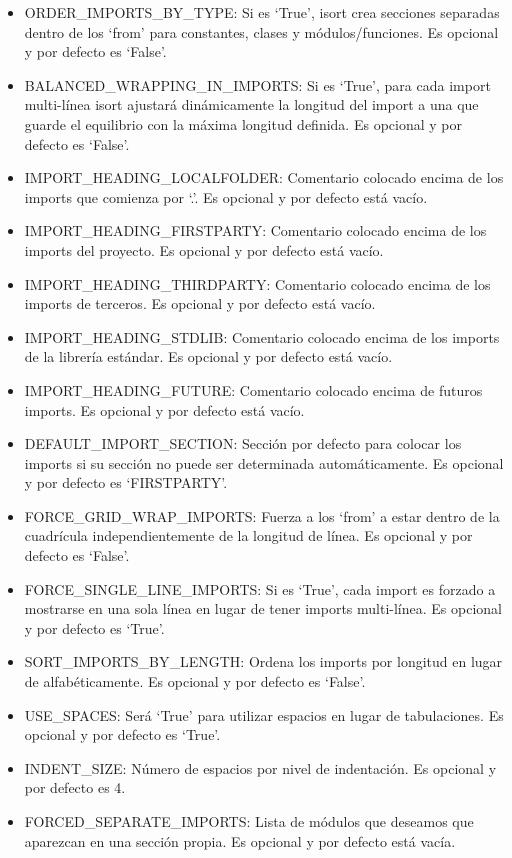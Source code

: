 \documentclass[a4paper, 12pt]{book}
\begin{document}
\begin{itemize}
\begin{itemize}
          \item ORDER\_IMPORTS\_BY\_TYPE: Si es `True', isort crea secciones separadas dentro de los `from' para constantes, clases y módulos/funciones. Es opcional y por defecto es `False'.
          \item BALANCED\_WRAPPING\_IN\_IMPORTS: Si es `True', para cada import multi-línea isort ajustará dinámicamente la longitud del import a una que guarde el equilibrio con la máxima longitud definida. Es opcional y por defecto es `False'.
          \item IMPORT\_HEADING\_LOCALFOLDER: Comentario colocado encima de los imports que comienza por `.'. Es opcional y por defecto está vacío.
          \item IMPORT\_HEADING\_FIRSTPARTY: Comentario colocado encima de los imports del proyecto. Es opcional y por defecto está vacío.
          \item IMPORT\_HEADING\_THIRDPARTY: Comentario colocado encima de los imports de terceros. Es opcional y por defecto está vacío.
          \item IMPORT\_HEADING\_STDLIB: Comentario colocado encima de los imports de la librería estándar. Es opcional y por defecto está vacío.
          \item IMPORT\_HEADING\_FUTURE: Comentario colocado encima de futuros imports. Es opcional y por defecto está vacío.
          \item DEFAULT\_IMPORT\_SECTION: Sección por defecto para colocar los imports si su sección no puede ser determinada automáticamente. Es opcional y por defecto es `FIRSTPARTY'.
          \item FORCE\_GRID\_WRAP\_IMPORTS: Fuerza a los `from' a estar dentro de la cuadrícula independientemente de la longitud de línea. Es opcional y por defecto es `False'.
          \item FORCE\_SINGLE\_LINE\_IMPORTS: Si es `True', cada import es forzado a mostrarse en una sola línea en lugar de tener imports multi-línea. Es opcional y por defecto es `True'.
          \item SORT\_IMPORTS\_BY\_LENGTH: Ordena los imports por longitud en lugar de alfabéticamente. Es opcional y por defecto es `False'.
          \item USE\_SPACES: Será `True' para utilizar espacios en lugar de tabulaciones. Es opcional y por defecto es `True'.
          \item INDENT\_SIZE: Número de espacios por nivel de indentación. Es opcional y por defecto es 4.
          \item FORCED\_SEPARATE\_IMPORTS: Lista de módulos que deseamos que aparezcan en una sección propia. Es opcional y por defecto está vacía.

\end{itemize}
\end{itemize}
\end{document}

